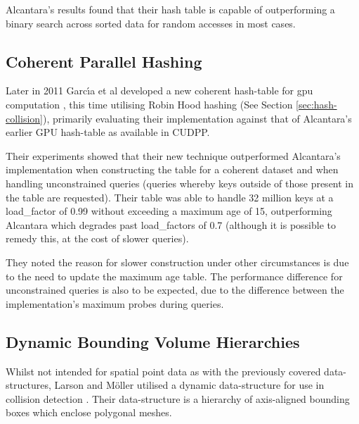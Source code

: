       Alcantara's results found that their hash table is capable of outperforming a binary search across sorted data for random accesses in most cases.    
      
    \subsection{Coherent Parallel Hashing}
      Later in 2011 Garc{\'\i}a et al developed a new coherent hash-table for \gls{gpu} computation \cite{GL*11}, this time utilising Robin Hood hashing (See Section \ref{sec:hash-collision}), primarily evaluating their implementation against that of Alcantara's earlier GPU hash-table as available in CUDPP.
      
      Their experiments showed that their new technique outperformed Alcantara's implementation when constructing the table for a coherent dataset and when handling unconstrained queries (queries whereby keys outside of those present in the table are requested). Their table was able to handle 32 million keys at a \gls{load_factor} of 0.99 without exceeding a maximum age of 15, outperforming Alcantara which degrades past \glspl{load_factor} of 0.7 (although it is possible to remedy this, at the cost of slower queries).
      
      They noted the reason for slower construction under other circumstances is due to the need to update the maximum age table. The performance difference for unconstrained queries is also to be expected, due to the difference between the implementation's maximum probes during queries.
      
      
    \subsection{Dynamic Bounding Volume Hierarchies}
      Whilst not intended for spatial point data as with the previously covered data-structures, Larson and M\"oller utilised a dynamic data-structure for use in collision detection \cite{LA06}. Their data-structure is a hierarchy of axis-aligned bounding boxes which enclose polygonal meshes. 
      
